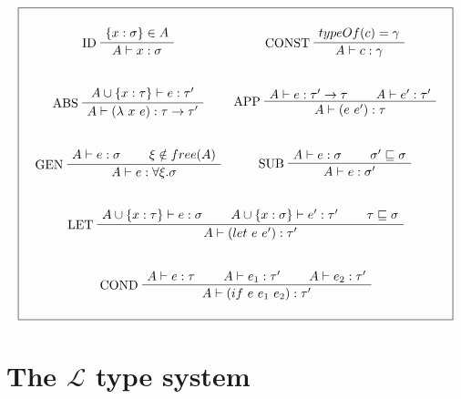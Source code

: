 \documentclass[a4paper]{report}
\newcommand{\lang}[0]{\mathcal{L}}
\newcommand{\ax}[1]%
{\AxiomC{$#1$}}
\newcommand{\unc}[1]%
{\UnaryInfC{$#1$}}
\newcommand{\bic}[1]%
{\BinaryInfC{$#1$}}
\newcommand{\tric}[1]%
{\TrinaryInfC{$#1$}}
\newcommand{\drule}%
{\DisplayProof}
\begin{document}
\begin{table}
\centering
$$\boxed{\begin{array}{c}\begin{array}{cc}
\\
\ax{\{x:\sigma\}\in A}
\LeftLabel{ID}
\unc{A\vdash x:\sigma}
\drule
&
\ax{typeOf(c)=\gamma}
\LeftLabel{CONST}
\unc{A\vdash c:\gamma}
\drule
\\\\\\
\ax{A\cup\{x:\tau\}\vdash e:\tau'}
\LeftLabel{ABS}
\unc{A\vdash(\lambda\ x\ e):\tau\to\tau'}
\drule
&
\ax{A\vdash e:\tau'\to\tau}
\ax{A\vdash e':\tau'}
\LeftLabel{APP}
\bic{A\vdash (e\ e'):\tau}
\drule
\\\\\\
\ax{A\vdash e:\sigma}
\ax{\xi\notin free(A)}
\LeftLabel{GEN}
\bic{A\vdash e:\forall\xi.\sigma}
\drule
&
\ax{A\vdash e:\sigma}
\ax{\sigma'\sqsubseteq\sigma}
\LeftLabel{SUB}
\bic{A\vdash e:\sigma'}
\drule
\end{array}
\\\\\\
\ax{A\cup\{x:\tau\}\vdash e:\sigma}
\ax{A\cup\{x:\sigma\}\vdash e':\tau'}
\ax{\tau\sqsubseteq\sigma}
\LeftLabel{LET}
\tric{A\vdash (let\ e\ e'):\tau'}
\drule
\\\\\\
\ax{A\vdash e:\tau}
\ax{A\vdash e_1:\tau'}
\ax{A\vdash e_2:\tau'}
\LeftLabel{COND}
\tric{A\vdash (if\ e\ e_1\ e_2):\tau'}
\drule
\\\\
\end{array}
}$$
\caption{A Hindley-Milner based type system.}
\label{hm_ts}
\end{table}

\section{The $\lang$ type system}
\end{document}
